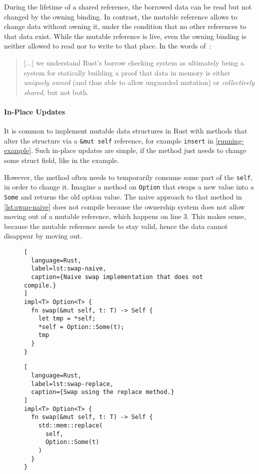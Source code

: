 During the lifetime of a shared reference, the borrowed data can be read but not
changed by the owning binding. In contrast, the mutable reference allows to
change data without owning it, under the condition that no other references to
that data exist. While the mutable reference is live, even the owning binding is
neither allowed to read nor to write to that place. In the words
of~\citet{oxide}:

\begin{quote}
{[...]} we understand Rust's borrow checking system as ultimately being a system
for statically building a proof that data in memory is either
\emph{uniquely owned} (and thus able to allow unguarded mutation) or
\emph{collectively shared}, but not both.
\end{quote}

\paragraph{In-Place Updates}

It is common to implement mutable data structures in Rust with methods that
alter the structure via a \passthrough{\lstinline!&mut self!} reference, for
example \lstinline!insert! in \autoref{running-example}. Such in-place updates
are simple, if the method just needs to change some struct field, like in the
example.

However, the method often needs to temporarily consume some part of the
\lstinline!self!, in order to change it. Imagine a method on \lstinline!Option!
that swaps a new value into a \lstinline!Some! and returns the old option value.
The naive approach to that method in \autoref{lst:swap-naive} does not compile
because the ownership system does not allow moving out of a mutable reference,
which happens on line 3. This makes sense, because the mutable reference needs
to stay valid, hence the data cannot disappear by moving out.

\begin{figure}[hbt]
\noindent\begin{minipage}[t]{.48\textwidth}
\begin{lstlisting}[
  language=Rust,
  label=lst:swap-naive,
  caption={Naive swap implementation that does not compile.}
]
impl<T> Option<T> {
  fn swap(&mut self, t: T) -> Self {
    let tmp = *self;
    *self = Option::Some(t);
    tmp
  }
}
\end{lstlisting}
\end{minipage}\hfill
\begin{minipage}[t]{.48\textwidth}
\begin{lstlisting}[
  language=Rust,
  label=lst:swap-replace,
  caption={Swap using the replace method.}
]
impl<T> Option<T> {
  fn swap(&mut self, t: T) -> Self {
    std::mem::replace(
      self,
      Option::Some(t)
    )
  }
}
\end{lstlisting}
\end{minipage}
\end{figure}


